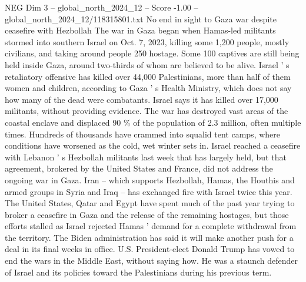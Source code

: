 \begin{textsample}{NEG Dim 3 – global\_north\_2024\_12 – Score -1.00 – global\_north\_2024\_12/118315801.txt}
No end in sight to Gaza war despite ceasefire with Hezbollah The war in Gaza began when Hamas-led militants stormed into southern Israel on Oct. 7, 2023, killing some 1,200 people, mostly civilians, and taking around people 250 hostage.
Some 100 captives are still being held inside Gaza, around two-thirds of whom are believed to be alive.
Israel ' s retaliatory offensive has killed over 44,000 Palestinians, more than half of them women and children, according to Gaza ' s Health Ministry, which does not say how many of the dead were combatants.
Israel says it has killed over 17,000 militants, without providing evidence.
The war has destroyed vast areas of the coastal enclave and displaced 90 \% of the population of 2.3 million, often multiple times.
Hundreds of thousands have crammed into squalid tent camps, where conditions have worsened as the cold, wet winter sets in.
Israel reached a ceasefire with Lebanon ' s Hezbollah militants last week that has largely held, but that agreement, brokered by the United States and France, did not address the ongoing war in Gaza.
Iran -- which supports Hezbollah, Hamas, the Houthis and armed groups in Syria and Iraq -- has exchanged fire with Israel twice this year.
The United States, Qatar and Egypt have spent much of the past year trying to broker a ceasefire in Gaza and the release of the remaining hostages, but those efforts stalled as Israel rejected Hamas ' demand for a complete withdrawal from the territory.
The Biden administration has said it will make another push for a deal in its final weeks in office.
U.S.
President-elect Donald Trump has vowed to end the wars in the Middle East, without saying how.
He was a staunch defender of Israel and its policies toward the Palestinians during his previous term.

\end{textsample}
